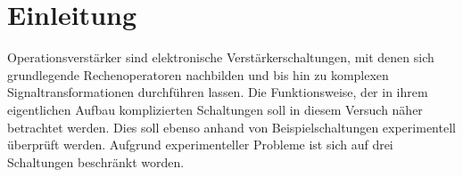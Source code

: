 \section{Einleitung}
Operationsverstärker sind elektronische Verstärkerschaltungen, mit denen sich grundlegende Rechenoperatoren nachbilden und bis hin zu komplexen Signaltransformationen durchführen lassen. Die Funktionsweise, der in ihrem eigentlichen Aufbau komplizierten Schaltungen soll in diesem Versuch näher betrachtet werden. Dies soll ebenso anhand von Beispielschaltungen experimentell überprüft werden. Aufgrund experimenteller Probleme ist sich auf drei Schaltungen beschränkt worden.
